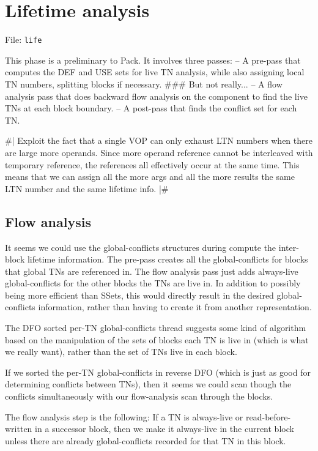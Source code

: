 
\chapter{Lifetime analysis}

File: {\tt life}

This phase is a preliminary to Pack.  It involves three passes:
 -- A pre-pass that computes the DEF and USE sets for live TN analysis, while
    also assigning local TN numbers, splitting blocks if necessary.  \#\#\# But
not really...
 -- A flow analysis pass that does backward flow analysis on the
    component to find the live TNs at each block boundary.
 -- A post-pass that finds the conflict set for each TN.

\#|
Exploit the fact that a single VOP can only exhaust LTN numbers when there are
large more operands.  Since more operand reference cannot be interleaved with
temporary reference, the references all effectively occur at the same time.
This means that we can assign all the more args and all the more results the
same LTN number and the same lifetime info.
|\#


\section{Flow analysis}

It seems we could use the global-conflicts structures during compute the
inter-block lifetime information.  The pre-pass creates all the
global-conflicts for blocks that global TNs are referenced in.  The flow
analysis pass just adds always-live global-conflicts for the other blocks the
TNs are live in.  In addition to possibly being more efficient than SSets, this
would directly result in the desired global-conflicts information, rather than
having to create it from another representation.

The DFO sorted per-TN global-conflicts thread suggests some kind of algorithm
based on the manipulation of the sets of blocks each TN is live in (which is
what we really want), rather than the set of TNs live in each block.

If we sorted the per-TN global-conflicts in reverse DFO (which is just as good
for determining conflicts between TNs), then it seems we could scan though the
conflicts simultaneously with our flow-analysis scan through the blocks.

The flow analysis step is the following:
    If a TN is always-live or read-before-written in a successor block, then we
    make it always-live in the current block unless there are already
    global-conflicts recorded for that TN in this block.

